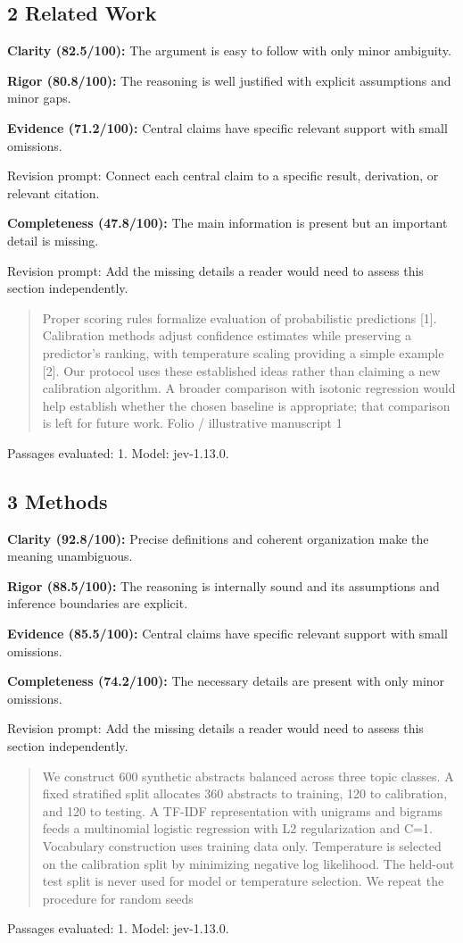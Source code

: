 \documentclass[11pt]{article}
\begin{document}
\subsection{2 Related Work}
\par\textbf{Clarity (82.5/100):} The argument is easy to follow with only minor ambiguity.
\par\textbf{Rigor (80.8/100):} The reasoning is well justified with explicit assumptions and minor gaps.
\par\textbf{Evidence (71.2/100):} Central claims have specific relevant support with small omissions.
\par Revision prompt: Connect each central claim to a specific result, derivation, or relevant citation.
\par\textbf{Completeness (47.8/100):} The main information is present but an important detail is missing.
\par Revision prompt: Add the missing details a reader would need to assess this section independently.
\begin{quote}\small Proper scoring rules formalize evaluation of probabilistic predictions [1]. Calibration methods adjust
confidence estimates while preserving a predictor's ranking, with temperature scaling providing a simple
example [2]. Our protocol uses these established ideas rather than claiming a new calibration algorithm.
A broader comparison with isotonic regression would help establish whether the chosen baseline is
appropriate; that comparison is left for future work.
Folio / illustrative manuscript                                      1\end{quote}
Passages evaluated: 1. Model: jev-1.13.0.
\subsection{3 Methods}
\par\textbf{Clarity (92.8/100):} Precise definitions and coherent organization make the meaning unambiguous.
\par\textbf{Rigor (88.5/100):} The reasoning is internally sound and its assumptions and inference boundaries are explicit.
\par\textbf{Evidence (85.5/100):} Central claims have specific relevant support with small omissions.
\par\textbf{Completeness (74.2/100):} The necessary details are present with only minor omissions.
\par Revision prompt: Add the missing details a reader would need to assess this section independently.
\begin{quote}\small We construct 600 synthetic abstracts balanced across three topic classes. A fixed stratified split
allocates 360 abstracts to training, 120 to calibration, and 120 to testing. A TF-IDF representation with
unigrams and bigrams feeds a multinomial logistic regression with L2 regularization and C=1.
Vocabulary construction uses training data only. Temperature is selected on the calibration split by
minimizing negative log likelihood. The held-out test split is never used for model or temperature
selection. We repeat the procedure for random seeds \end{quote}
Passages evaluated: 1. Model: jev-1.13.0.
\end{document}
